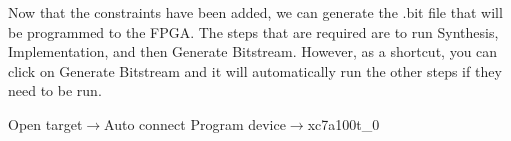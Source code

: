 
Now that the constraints have been added, we can generate the .bit file that will be
programmed to the FPGA.
The steps that are required are to run Synthesis, Implementation, and then Generate Bitstream.
However, as a shortcut, you can click on Generate Bitstream and it will automatically run the
other steps if they need to be run.

Open target$\rightarrow$Auto connect
Program device$\rightarrow$xc7a100t_0


